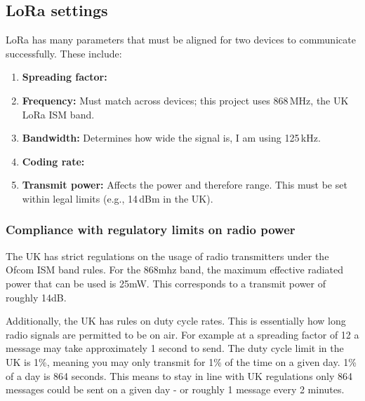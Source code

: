\subsection{LoRa settings}

LoRa has many parameters that must be aligned for two devices to communicate
successfully. These include:

\begin{enumerate}
  \item \textbf{Spreading factor:} 
  \item \textbf{Frequency:} Must match across devices; this project uses 868\,MHz, the UK LoRa ISM band.
  \item \textbf{Bandwidth:} Determines how wide the signal is, I am using 125\,kHz.
  \item \textbf{Coding rate:} 
  \item \textbf{Transmit power:} Affects the power and therefore range. This must be set within legal limits (e.g., 14\,dBm in the UK).
\end{enumerate}

\subsubsection{Compliance with regulatory limits on radio power}

The UK has strict regulations on the usage of radio transmitters under the Ofcom ISM band rules.
For the 868mhz band, the maximum effective radiated power that can be used is 25mW. This corresponds to a transmit power of roughly 14dB.

Additionally, the UK has rules on duty cycle rates. This is essentially how long
radio signals are permitted to be on air. For example at a spreading factor of
12 a message may take approximately 1 second to send. The duty cycle limit in
the UK is 1\%, meaning you may only transmit for 1\% of the time on a given day.
1\% of a day is 864 seconds. This means to stay in line with UK regulations only
864 messages could be sent on a given day - or roughly 1 message every 2
minutes.